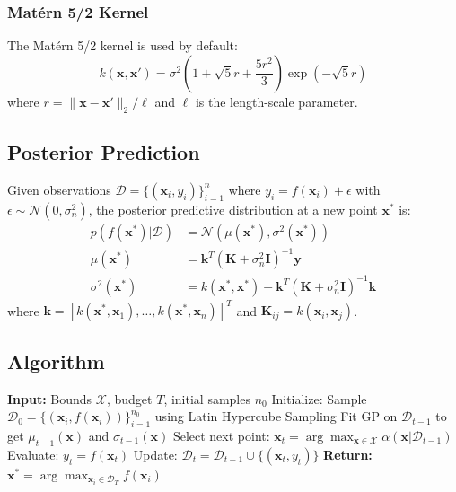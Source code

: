 \documentclass[11pt,a4paper]{article}
\begin{document}
\subsubsection{Matérn 5/2 Kernel}

The Matérn 5/2 kernel is used by default:
\begin{equation}
    k(\mathbf{x}, \mathbf{x}') = \sigma^2 \left(1 + \sqrt{5}r + \frac{5r^2}{3}\right) \exp(-\sqrt{5}r)
\end{equation}
where $r = \|\mathbf{x} - \mathbf{x}'\|_2 / \ell$ and $\ell$ is the length-scale parameter.

\subsection{Posterior Prediction}

Given observations $\mathcal{D} = \{(\mathbf{x}_i, y_i)\}_{i=1}^n$ where $y_i = f(\mathbf{x}_i) + \epsilon$ with $\epsilon \sim \mathcal{N}(0, \sigma_n^2)$, the posterior predictive distribution at a new point $\mathbf{x}^*$ is:
\begin{align}
    p(f(\mathbf{x}^*) | \mathcal{D}) &= \mathcal{N}(\mu(\mathbf{x}^*), \sigma^2(\mathbf{x}^*)) \\
    \mu(\mathbf{x}^*) &= \mathbf{k}^T (\mathbf{K} + \sigma_n^2 \mathbf{I})^{-1} \mathbf{y} \\
    \sigma^2(\mathbf{x}^*) &= k(\mathbf{x}^*, \mathbf{x}^*) - \mathbf{k}^T (\mathbf{K} + \sigma_n^2 \mathbf{I})^{-1} \mathbf{k}
\end{align}
where $\mathbf{k} = [k(\mathbf{x}^*, \mathbf{x}_1), \ldots, k(\mathbf{x}^*, \mathbf{x}_n)]^T$ and $\mathbf{K}_{ij} = k(\mathbf{x}_i, \mathbf{x}_j)$.

\subsection{Algorithm}

\begin{algorithm}[H]
\caption{Gaussian Process Bayesian Optimization}
\begin{algorithmic}[1]
\State \textbf{Input:} Bounds $\mathcal{X}$, budget $T$, initial samples $n_0$
\State Initialize: Sample $\mathcal{D}_0 = \{(\mathbf{x}_i, f(\mathbf{x}_i))\}_{i=1}^{n_0}$ using Latin Hypercube Sampling
    \State Fit GP on $\mathcal{D}_{t-1}$ to get $\mu_{t-1}(\mathbf{x})$ and $\sigma_{t-1}(\mathbf{x})$
    \State Select next point: $\mathbf{x}_t = \arg\max_{\mathbf{x} \in \mathcal{X}} \alpha(\mathbf{x} | \mathcal{D}_{t-1})$
    \State Evaluate: $y_t = f(\mathbf{x}_t)$
    \State Update: $\mathcal{D}_t = \mathcal{D}_{t-1} \cup \{(\mathbf{x}_t, y_t)\}$
\EndFor
\State \textbf{Return:} $\mathbf{x}^* = \arg\max_{\mathbf{x}_i \in \mathcal{D}_T} f(\mathbf{x}_i)$
\end{algorithmic}
\end{algorithm}
\end{document}
